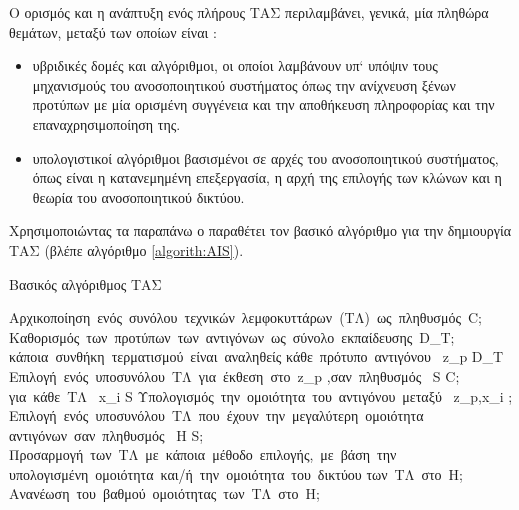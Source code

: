\documentclass{assignment}
\begin{document}
Ο ορισμός και η ανάπτυξη ενός πλήρους ΤΑΣ περιλαμβάνει, γενικά, μία πληθώρα θεμάτων, μεταξύ των οποίων είναι \cite{engelbrecht,karakasis_thesis}:

\begin{itemize}
\item υβριδικές δομές και αλγόριθμοι, οι οποίοι λαμβάνουν υπ` υπόψιν τους μηχανισμούς του ανοσοποιητικού συστήματος όπως την ανίχνευση ξένων προτύπων με μία ορισμένη συγγένεια και την αποθήκευση πληροφορίας και την επαναχρησιμοποίηση της.
\item υπολογιστικοί αλγόριθμοι βασισμένοι σε αρχές του ανοσοποιητικού συστήματος, όπως είναι η κατανεμημένη επεξεργασία, η αρχή της επιλογής των κλώνων και η θεωρία του ανοσοποιητικού δικτύου.
\end{itemize}


Χρησιμοποιώντας τα παραπάνω ο \citeauthor{engelbrecht} παραθέτει τον βασικό αλγόριθμο για την δημιουργία ΤΑΣ (βλέπε αλγόριθμο \ref{algorith:AIS}). 
\begin{algorithm}                        %
\caption{Βασικός αλγόριθμος ΤΑΣ \cite{engelbrecht}}          %
\label{algorith:AIS}                      %
\begin{program}
\mbox{Αρχικοποίηση ενός συνόλου τεχνικών λεμφοκυττάρων (ΤΛ) ως πληθυσμός }C;
\mbox{Καθορισμός των προτύπων των αντιγόνων ως σύνολο εκπαίδευσης }D_T;
\WHILE \mbox{κάποια συνθήκη τερματισμού είναι αναληθείς} \DO 
  \FOR \mbox{κάθε πρότυπο αντιγόνου } z_p \in D_T \DO
    \mbox{Επιλογή ενός υποσυνόλου ΤΛ για έκθεση στο }z_p \mbox{,σαν πληθυσμός } S \leq C;
    \FOR \mbox{για κάθε ΤΛ } x_i \in S \DO
          \mbox{Υπολογισμός την ομοιότητα του αντιγόνου μεταξύ } z_p,x_i ;
    \END
    \mbox{Επιλογή ενός υποσυνόλου ΤΛ που έχουν την μεγαλύτερη ομοιότητα }
    \mbox{αντιγόνων σαν πληθυσμός } H \leq S;
    \mbox{Προσαρμογή των ΤΛ με κάποια μέθοδο επιλογής, με βάση την}
    \mbox{υπολογισμένη ομοιότητα και/ή την ομοιότητα του δικτύου}
    \mbox{των ΤΛ στο }H;
    \mbox{Ανανέωση του βαθμού ομοιότητας των ΤΛ στο }H;
  \END
\END
\end{program}
\end{algorithm}
\end{document}
